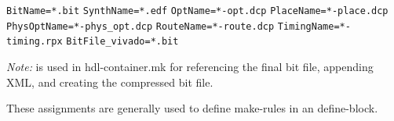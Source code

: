 \verb+BitName=*.bit+\newline
\verb+SynthName=*.edf+\newline
\verb+OptName=*-opt.dcp+\newline
\verb+PlaceName=*-place.dcp+\newline
\verb+PhysOptName=*-phys_opt.dcp+\newline
\verb+RouteName=*-route.dcp+\newline
\verb+TimingName=*-timing.rpx+\newline
\verb+BitFile_vivado=*.bit+\newline

\textit{Note:}  is used in hdl-container.mk for referencing the final bit file, appending XML, and creating the compressed bit file. \newline


These  assignments are generally used to define make-rules in an  define-block.\newline

